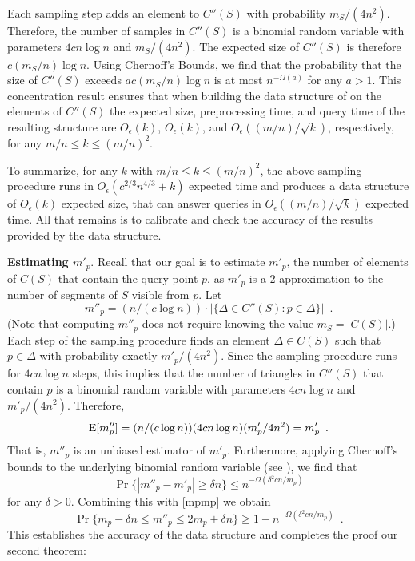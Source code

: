 \documentclass{patmorin}
\newcommand{\Oe}{O_\epsilon}
\begin{document}
Each sampling step adds an element to $C''(S)$ with probability $m_S/(4n^2)$.
Therefore, the number of samples in $C''(S)$ is a binomial random
variable with parameters $4cn\log n$ and $m_S/(4n^2)$.  The expected
size of $C''(S)$ is therefore $c(m_S/n)\log n$. Using Chernoff's
Bounds, we find that the probability that the size of $C''(S)$
exceeds $ac(m_S/n)\log n$ is at most $n^{-\Omega(a)}$ for any $a>1$.
This concentration result ensures that when building the data structure
of  on the elements of $C''(S)$ the expected
size, preprocessing time, and query time of the resulting structure are
$\Oe(k)$, $\Oe(k)$, and $\Oe((m/n)/\sqrt{k})$, respectively, for any
$m/n\le k\le (m/n)^2$.

To summarize, for any $k$ with $m/n \le k \le (m/n)^2$, the above
sampling procedure runs in $\Oe(c^{2/3}n^{4/3} + k)$ expected time and
produces a data structure of $\Oe(k)$ expected size, that can answer
queries in $\Oe((m/n)/\sqrt{k})$ expected time.  All that remains is to
calibrate and check the accuracy of the results provided by the data
structure.

\noindent\textbf{Estimating $m'_p$}.
Recall that our goal is to estimate $m'_p$, the number of elements of $C(S)$
that contain the query point $p$, as $m'_p$ is a 2-approximation to the
number of segments of $S$ visible from $p$.  Let
\[
    m''_p = (n/(c\log n))\cdot |\{ \Delta\in C''(S) : p\in \Delta\}| \enspace .
\]
(Note that computing $m''_p$ does not require knowing the value
$m_S=|C(S)|$.)  Each step of the sampling procedure finds an element
$\Delta\in C(S)$ such that $p\in\Delta$ with probability exactly $m'_p
/ (4n^2)$.  Since the sampling procedure runs for $4cn\log n$ steps, this
implies that the number of triangles in $C''(S)$ that contain $p$ is a
binomial random variable with parameters $4cn\log n$ and $m'_p/(4n^2)$.
Therefore,
\[
    \mathrm{E}[m''_p] = (n/(c\log n))(4cn\log n)(m'_p/4n^2) = m'_p \enspace .
\]
That is, $m''_p$ is an unbiased estimator of $m'_p$.  Furthermore, applying
Chernoff's bounds to the underlying binomial random variable (see
), 
we find that
\[
   \Pr\{|m''_p - m'_p| \ge \delta n\} \le n^{-\Omega(\delta^2cn/m_p)}
\]
for any $\delta > 0$.  Combining this with \eqref{mpmp} we obtain
\[
   \Pr\{m_p-\delta n \le m''_p \le 2m_p+\delta n\} 
     \ge 1-n^{-\Omega(\delta^2 cn/m_p)}  \enspace .
\]
This establishes the accuracy of the data structure and completes the proof
our second theorem:
\end{document}
